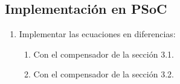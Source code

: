 \subsection{Implementación en PSoC}
\begin{enumerate}[label=4.\arabic*.]
	\item Implementar las ecuaciones en diferencias:
	\begin{enumerate}[label*=4.\arabic*.]
			\item Con el compensador de la sección 3.1.
			\item Con el compensador de la sección 3.2.
			
		\end{enumerate}
\end{enumerate}
